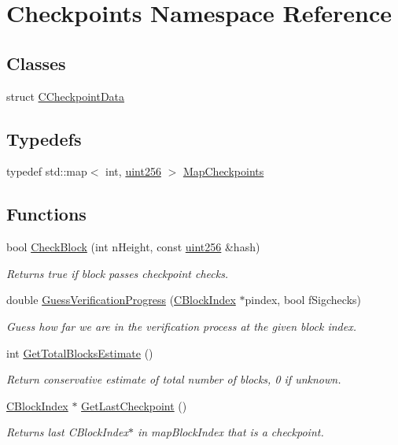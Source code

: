 \hypertarget{namespace_checkpoints}{}\section{Checkpoints Namespace Reference}
\label{namespace_checkpoints}
\subsection*{Classes}
\begin{DoxyCompactItemize}
\item 
struct \hyperlink{struct_checkpoints_1_1_c_checkpoint_data}{C\+Checkpoint\+Data}
\end{DoxyCompactItemize}
\subsection*{Typedefs}
\begin{DoxyCompactItemize}
\item 
typedef std\+::map$<$ int, \hyperlink{classuint256}{uint256} $>$ \hyperlink{namespace_checkpoints_a996cca530c4568a2eb4516e8f351b9a2}{Map\+Checkpoints}
\end{DoxyCompactItemize}
\subsection*{Functions}
\begin{DoxyCompactItemize}
\item 
bool \hyperlink{namespace_checkpoints_a4d9e42c5e5659730fc98113a94e2c84c}{Check\+Block} (int n\+Height, const \hyperlink{classuint256}{uint256} \&hash)
\begin{DoxyCompactList}\small\item\em Returns true if block passes checkpoint checks. \end{DoxyCompactList}\item 
double \hyperlink{namespace_checkpoints_ad473e253a3826fec1a7f9394c695ba91}{Guess\+Verification\+Progress} (\hyperlink{class_c_block_index}{C\+Block\+Index} $\ast$pindex, bool f\+Sigchecks)
\begin{DoxyCompactList}\small\item\em Guess how far we are in the verification process at the given block index. \end{DoxyCompactList}\item 
int \hyperlink{namespace_checkpoints_ac4dc0a0ba00009be52fee3eef694c2c0}{Get\+Total\+Blocks\+Estimate} ()
\begin{DoxyCompactList}\small\item\em Return conservative estimate of total number of blocks, 0 if unknown. \end{DoxyCompactList}\item 
\hyperlink{class_c_block_index}{C\+Block\+Index} $\ast$ \hyperlink{namespace_checkpoints_acd7c59bef29b80f040017d27b76e09a8}{Get\+Last\+Checkpoint} ()
\begin{DoxyCompactList}\small\item\em Returns last C\+Block\+Index$\ast$ in map\+Block\+Index that is a checkpoint. \end{DoxyCompactList}\end{DoxyCompactItemize}
